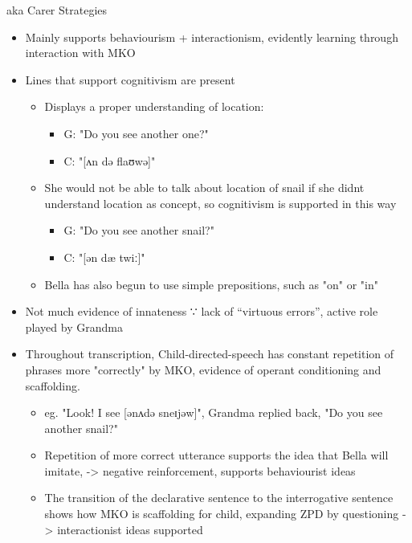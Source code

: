 \documentclass[
]{article}
\providecommand{\tightlist}{%
  \setlength{\itemsep}{0pt}\setlength{\parskip}{0pt}}
\begin{document}
aka Carer Strategies

\begin{itemize}
\item
  Mainly supports behaviourism + interactionism, evidently learning
  through interaction with MKO
\item
  Lines that support cognitivism are present

  \begin{itemize}
  \tightlist
  \item
    Displays a proper understanding of location:

    \begin{itemize}
    \tightlist
    \item
      G: "Do you see another one?"
    \item
      C: "{[}ʌn də flaʊwə{]}"
    \end{itemize}
  \item
    She would not be able to talk about location of snail if she
    didn\textquotesingle t understand location as concept, so
    cognitivism is supported in this way

    \begin{itemize}
    \tightlist
    \item
      G: "Do you see another snail?"
    \item
      C: "{[}ən dæ twiː{]}"
    \end{itemize}
  \item
    Bella has also begun to use simple prepositions, such as "on" or
    "in"
  \end{itemize}
\item
  Not much evidence of innateness ∵ lack of ``virtuous errors'', active
  role played by Grandma
\item
  Throughout transcription, Child-directed-speech has constant
  repetition of phrases more "correctly" by MKO, evidence of operant
  conditioning and scaffolding.

  \begin{itemize}
  \tightlist
  \item
    eg. "Look! I see {[}ənʌdə sneɪjəw{]}", Grandma replied back, "Do you
    see another snail?"
  \item
    Repetition of more correct utterance supports the idea that Bella
    will imitate, -\textgreater{} negative reinforcement, supports
    behaviourist ideas
  \item
    The transition of the declarative sentence to the interrogative
    sentence shows how MKO is scaffolding for child, expanding ZPD by
    questioning -\textgreater{} interactionist ideas supported
  \end{itemize}
\end{itemize}
\end{document}
